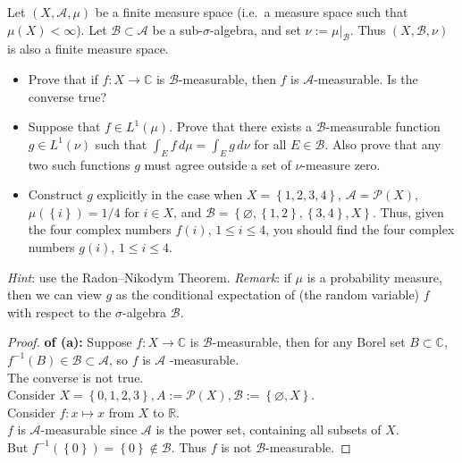\documentclass{qlnotes-export}
\begin{document}
Let \((X,\mathcal{A},\mu)\) be a finite measure space (i.e.~a measure space such that \(\mu(X) < \infty\)). Let \(\mathcal{B} \subset \mathcal{A}\) be a sub-\(\sigma\)-algebra, and set \(\nu := \mu|_{\mathcal{B}}\). Thus \((X,\mathcal{B},\nu)\) is also a finite measure space.

\begin{itemize}
\item
  Prove that if \(f:X\rightarrow{\mathbb{C}}\) is \(\mathcal{B}\)-measurable, then \(f\) is \(\mathcal{A}\)-measurable. Is the converse true?
\item
  Suppose that \(f \in L^{1}(\mu)\). Prove that there exists a \(\mathcal{B}\)-measurable function \(g \in L^{1}(\nu)\) such that \(\int_{E}f\, d\mu = \int_{E}g\, d\nu\) for all \(E \in \mathcal{B}\). Also prove that any two such functions \(g\) must agree outside a set of \(\nu\)-measure zero.
\item
  Construct \(g\) explicitly in the case when \(X = \left\{ {1,2,3,4} \right\}\), \(\mathcal{A} = \mathcal{P}(X)\), \(\mu(\left\{ i \right\}) = 1/4\) for \(i \in X\), and \(\mathcal{B} = \left\{ {\varnothing,\left\{ {1,2} \right\},\left\{ {3,4} \right\},X} \right\}\). Thus, given the four complex numbers \(f(i)\), \(1 \leq i \leq 4\), you should find the four complex numbers \(g(i)\), \(1 \leq i \leq 4\).
\end{itemize}

\emph{Hint}: use the Radon--Nikodym Theorem. \emph{Remark}: if \(\mu\) is a probability measure, then we can view \(g\) as the conditional expectation of (the random variable) \(f\) with respect to the \(\sigma\)-algebra \(\mathcal{B}\).

\begin{proof}

\textbf{of (a):} Suppose \(f:X\rightarrow{\mathbb{C}}\) is \(\mathcal{B}\)-measurable, then for any Borel set \(B \subset {\mathbb{C}}\), \(f^{- 1}(B) \in \mathcal{B} \subset \mathcal{A}\), so \(f\) is \(\mathcal{A}\) -measurable.\\
The converse is not true.\\
Consider \(X = \left\{ {0,1,2,3} \right\},A := \mathcal{P}(X),\mathcal{B} := \left\{ {\varnothing,X} \right\}\).\\
Consider \(f:x\mapsto x\) from \(X\) to \(\mathbb{R}\).\\
\(f\) is \(\mathcal{A}\)-measurable since \(\mathcal{A}\) is the power set, containing all subsets of \(X\).\\
But \(f^{- 1}(\left\{ 0 \right\}) = \left\{ 0 \right\} \notin \mathcal{B}\). Thus \(f\) is not \(\mathcal{B}\)-measurable.

\end{proof}
\end{document}
